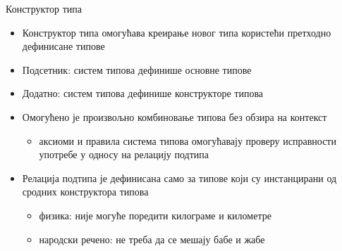 \documentclass[xcolor=table]{beamer}
\begin{document}
    \begin{frame}{Конструктор типа}
        \begin{itemize}
            \item Конструктор типа омогућава креирање новог типа користећи претходно дефинисане типове
            \item Подсетник: систем типова дефинише основне типове
            \item Додатно: систем типова дефинише конструкторе типова
            \item Омогућено је произвољно комбиновање типова без обзира на контекст
            \begin{itemize}
                \item аксиоми и правила система типова омогућавају проверу исправности употребе у односу на релацију подтипа
            \end{itemize}
            \item Релација подтипа је дефинисана само за типове који су инстанцирани од сродних конструктора типова
             \begin{itemize}
                \item физика: није могуће поредити килограме и километре
                \item народски речено: не треба да се мешају бабе и жабе
            \end{itemize}
        \end{itemize}
    \end{frame}
\end{document}
